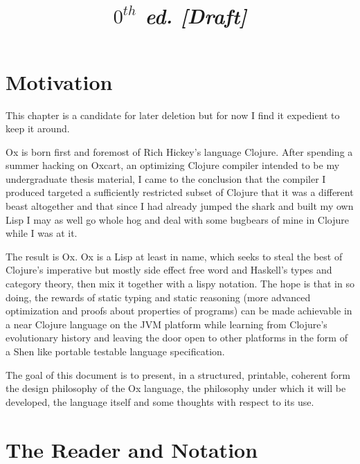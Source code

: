 \documentclass{report}
\title{
  \vspace{2in}
  \textmd{\textbf{\Title}}\\
  \vspace{0.1in}\large{\textit{$0^{th}$ ed. [Draft]}}
  \vspace{3in}
}
\author{\textbf{\AuthorName}}
\date{} %
\begin{document}
\maketitle



\newpage
\tableofcontents
\newpage

\chapter{Motivation}

This chapter is a candidate for later deletion but for now I find it expedient
to keep it around.

Ox is born first and foremost of Rich Hickey's language Clojure. After spending
a summer hacking on Oxcart, an optimizing Clojure compiler intended to be my
undergraduate thesis material, I came to the conclusion that the compiler I
produced targeted a sufficiently restricted subset of Clojure that it was a
different beast altogether and that since I had already jumped the shark and
built my own Lisp I may as well go whole hog and deal with some bugbears of mine
in Clojure while I was at it.

The result is Ox. Ox is a Lisp at least in name, which seeks to steal the best
of Clojure's imperative but mostly side effect free word and Haskell's types and
category theory, then mix it together with a lispy notation. The hope is that in
so doing, the rewards of static typing and static reasoning (more advanced
optimization and proofs about properties of programs) can be made achievable in
a near Clojure language on the JVM platform while learning from Clojure's
evolutionary history and leaving the door open to other platforms in the form of
a Shen like portable testable language specification.

The goal of this document is to present, in a structured, printable, coherent
form the design philosophy of the Ox language, the philosophy under which it
will be developed, the language itself and some thoughts with respect to its
use.

\chapter{The Reader and Notation}
\end{document}
